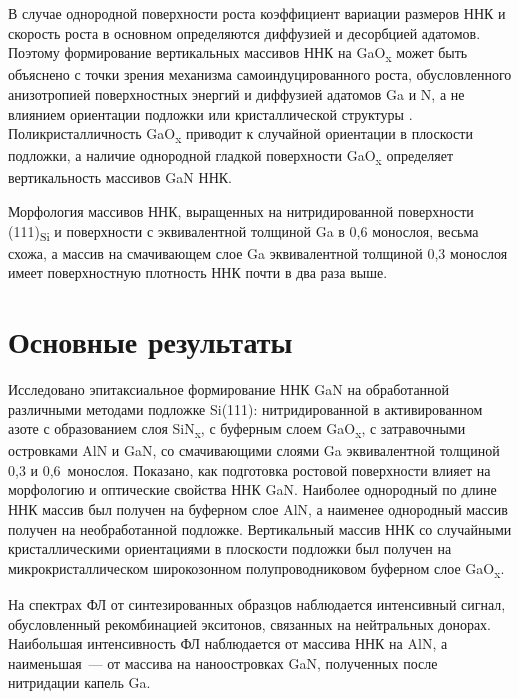 В случае однородной поверхности роста коэффициент вариации размеров ННК и скорость роста в основном определяются диффузией и десорбцией адатомов. Поэтому формирование вертикальных массивов ННК на GaO\textsubscript{x} может быть объяснено с точки зрения механизма самоиндуцированного роста, обусловленного анизотропией поверхностных энергий и диффузией адатомов Ga и N, а не влиянием ориентации подложки или кристаллической структуры \cite{Sobanska2016}. Поликристалличность GaO\textsubscript{x} приводит к случайной ориентации в плоскости подложки, а наличие однородной гладкой поверхности GaO\textsubscript{x} определяет вертикальность массивов GaN ННК.

Морфология массивов ННК, выращенных на нитридированной поверхности (111)\textsubscript{Si} и поверхности с эквивалентной толщиной Ga в 0,6 монослоя, весьма схожа, а массив на смачивающем слое Ga эквивалентной толщиной 0,3 монослоя имеет поверхностную плотность ННК почти в два раза выше.

\section{Основные результаты}\label{sec:ch4/sec6}

Исследовано эпитаксиальное формирование ННК GaN на обработанной различными методами подложке Si(111): нитридированной в активированном азоте с образованием слоя SiN\textsubscript{x}, с буферным слоем GaO\textsubscript{x}, с затравочными островками AlN и GaN, со смачивающими слоями Ga эквивалентной толщиной 0,3 и 0,6~монослоя. Показано, как подготовка ростовой поверхности влияет на морфологию и оптические свойства ННК GaN. Наиболее однородный по длине ННК массив был получен на буферном слое AlN, а наименее однородный массив получен на необработанной подложке. Вертикальный массив ННК со случайными кристаллическими ориентациями в плоскости подложки был получен на микрокристаллическом широкозонном полупроводниковом буферном слое GaO\textsubscript{x}.

На спектрах ФЛ от синтезированных образцов наблюдается интенсивный сигнал, обусловленный рекомбинацией экситонов, связанных на нейтральных донорах. Наибольшая интенсивность ФЛ наблюдается от массива ННК на AlN, а наименьшая~--- от массива на наноостровках GaN, полученных после нитридации капель Ga.

\FloatBarrier
